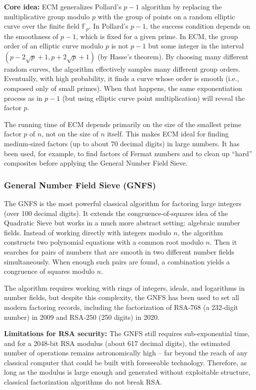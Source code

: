 \textbf{Core idea:} ECM generalizes Pollard’s \(p-1\) algorithm by replacing the multiplicative group modulo \(p\) with the group of points on a random elliptic curve over the finite field \(\mathbb{F}_p\). In Pollard’s \(p-1\), the success condition depends on the smoothness of \(p-1\), which is fixed for a given prime. In ECM, the group order of an elliptic curve modulo \(p\) is not \(p-1\) but some integer in the interval \((p-2\sqrt{p}+1, p+2\sqrt{p}+1)\) (by Hasse’s theorem). By choosing many different random curves, the algorithm effectively samples many different group orders. Eventually, with high probability, it finds a curve whose order is smooth (i.e., composed only of small primes). When that happens, the same exponentiation process as in \(p-1\) (but using elliptic curve point multiplication) will reveal the factor \(p\).

The running time of ECM depends primarily on the size of the smallest prime factor \(p\) of \(n\), not on the size of \(n\) itself. This makes ECM ideal for finding medium‑sized factors (up to about 70 decimal digits) in large numbers. It has been used, for example, to find factors of Fermat numbers and to clean up “hard” composites before applying the General Number Field Sieve.

\subsubsection{ General Number Field Sieve (GNFS)}

The GNFS is the most powerful classical algorithm for factoring large integers (over 100 decimal digits). It extends the congruence‑of‑squares idea of the Quadratic Sieve but works in a much more abstract setting: algebraic number fields. Instead of working directly with integers modulo \(n\), the algorithm constructs two polynomial equations with a common root modulo \(n\). Then it searches for pairs of numbers that are smooth in two different number fields simultaneously. When enough such pairs are found, a combination yields a congruence of squares modulo \(n\).

The algorithm requires working with rings of integers, ideals, and logarithms in number fields, but despite this complexity, the GNFS has been used to set all modern factoring records, including the factorization of RSA‑768 (a 232‑digit number) in 2009 and RSA‑250 (250 digits) in 2020.

\textbf{Limitations for RSA security:} The GNFS still requires sub‑exponential time, and for a 2048‑bit RSA modulus (about 617 decimal digits), the estimated number of operations remains astronomically high – far beyond the reach of any classical computer that could be built with foreseeable technology. Therefore, as long as the modulus is large enough and generated without exploitable structure, classical factorization algorithms do not break RSA.


